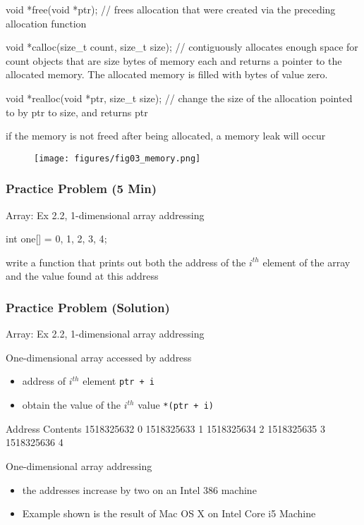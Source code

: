 \documentclass[newPxFont,sthlmFooter,nooffset]{beamer}
\begin{document}
\begin{frame}
\begin{codedef}
void *free(void *ptr); // frees allocation that were created via the preceding allocation function

void *calloc(size_t count, size_t size); // contiguously allocates enough space for count objects that are size bytes of memory each and returns a pointer to the allocated memory. The allocated memory is filled with bytes of value zero.

void *realloc(void *ptr, size_t size); // change the size of the allocation pointed to by ptr to size, and returns ptr
\end{codedef}


\framebreak

if the memory is not freed after being allocated, a memory leak will occur

\begin{figure}[h]
	\centering
	\texttt{[image: figures/fig03\_memory.png]}
\end{figure}
\end{frame}


\begin{frame}[t, fragile]
  \frametitle{Practice Problem (5 Min)}
  Array: Ex 2.2, 1-dimensional array addressing
\begin{codedef}
int one[] = {0, 1, 2, 3, 4};   
\end{codedef}

write a function that prints out both the address of the $i^{th}$ element of the array and the value found at this address

\end{frame}

\begin{frame}
  \frametitle{Practice Problem (Solution)}
  Array: Ex 2.2, 1-dimensional array addressing

  

One-dimensional array accessed by address
\begin{itemize}
\item address of $i^{th}$ element \texttt{ptr + i}
\item obtain the value of the $i^{th}$ value \texttt{*(ptr + i)}
\end{itemize}

\framebreak


\begin{codedefnb}
Address		Contents
1518325632	        0
1518325633	        1
1518325634	        2
1518325635	        3
1518325636	        4
\end{codedefnb}
\bigskip
One-dimensional array addressing
\begin{itemize}
\item the addresses increase by two on an Intel 386 machine
\item Example shown is the result of Mac OS X on Intel Core i5 Machine
\end{itemize}

\end{frame}
\end{document}
